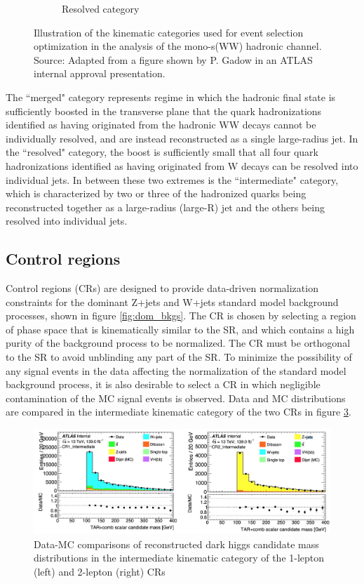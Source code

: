 \documentclass[12pt]{article}
\begin{document}
\begin{figure}[H]
\begin{subfigure}[b]{0.29\textwidth}
         \caption[]{Resolved category}
         \label{fig:had_resolved}
     \end{subfigure}
\caption[]{Illustration of the kinematic categories used for event selection optimization in the analysis of the mono-s(WW) hadronic channel. Source: Adapted from a figure shown by P. Gadow in an ATLAS internal approval presentation. }
\label{fig:had_categories}
\end{figure}

The ``merged" category represents regime in which the hadronic final state is sufficiently boosted in the transverse plane that the quark hadronizations identified as having originated from the hadronic WW decays cannot be individually resolved, and are instead reconstructed as a single large-radius jet. In the ``resolved" category, the boost is sufficiently small that all four quark hadronizations identified as having originated from W decays can be resolved into individual jets. In between these two extremes is the ``intermediate" category, which is characterized by two or three of the hadronized quarks being reconstructed together as a large-radius (large-R) jet and the others being resolved into individual jets.

\subsection{Control regions}

Control regions (CRs) are designed to provide data-driven normalization constraints for the dominant Z+jets and W+jets standard model background processes, shown in figure \ref{fig:dom_bkgs}. The CR is chosen by selecting a region of phase space that is kinematically similar to the SR, and which contains a high purity of the background process to be normalized. The CR must be orthogonal to the SR to avoid unblinding any part of the SR. To minimize the possibility of any signal events in the data affecting the normalization of the standard model background process, it is also desirable to select a CR in which negligible contamination of the MC signal events is observed. Data and MC distributions are compared in the intermediate kinematic category of the two CRs in figure \ref{fig:had_Intermediate_DataMC}. 

\begin{figure}[H]
	\centering
	\includegraphics[width=\textwidth]{figures/had_Intermediate_DataMC.png}
	\caption[]{Data-MC comparisons of reconstructed dark higgs candidate mass distributions in the intermediate kinematic category of the 1-lepton (left) and 2-lepton (right) CRs}
	\label{fig:had_Intermediate_DataMC} 
\end{figure}
\end{document}
